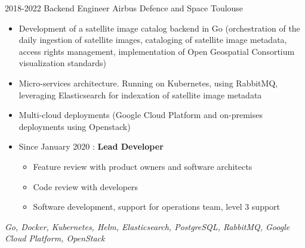 \cventry
    {2018-2022}
    {Backend Engineer}
    {}
    {Airbus Defence and Space}
    {Toulouse}
    {
        \begin{itemize}
            \item Development of a satellite image catalog backend in Go (orchestration of the daily ingestion of satellite images, cataloging of satellite image metadata, access rights management, implementation of Open Geospatial Consortium visualization standards)
            \item Micro-services architecture. Running on Kubernetes, using RabbitMQ, leveraging Elasticsearch for indexation of satellite image metadata
            \item Multi-cloud deployments (Google Cloud Platform and on-premises deployments using Openstack)
            \item Since January 2020 : \textbf{Lead Developer}
            \begin{itemize}
                \item Feature review with product owners and software architects
                \item Code review with developers
                \item Software development, support for operations team, level 3 support
            \end{itemize}
        \end{itemize}
        \textit{Go, Docker, Kubernetes, Helm, Elasticsearch, PostgreSQL, RabbitMQ, Google Cloud Platform, OpenStack}
    }
\vspace*{0.2cm}
